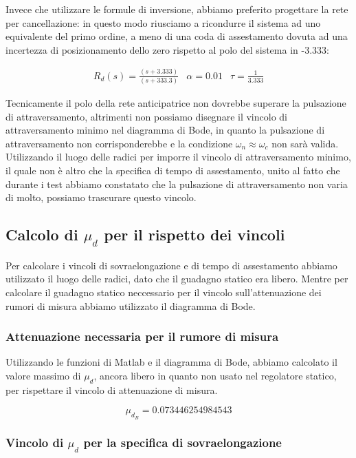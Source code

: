 \documentclass{article}
\begin{document}
Invece che utilizzare le formule di inversione, abbiamo preferito progettare la rete per cancellazione: in questo modo riusciamo a ricondurre il sistema ad uno equivalente del primo ordine, a meno di una coda di assestamento dovuta ad una incertezza di posizionamento dello zero rispetto al polo del sistema in -3.333:

$$
\begin{array}{lll}
    R_d(s) = \frac{(s+3.333)}{(s+333.3)} &\alpha=0.01 & \tau=\frac{1}{3.333}
\end{array}
$$

Tecnicamente il polo della rete anticipatrice non dovrebbe superare la pulsazione di attraversamento, altrimenti non possiamo disegnare il vincolo di attraversamento minimo nel diagramma di Bode, in quanto la pulsazione di attraversamento non corrisponderebbe e la condizione $\omega_n\approx\omega_c$ non sarà valida. Utilizzando il luogo delle radici per imporre il vincolo di attraversamento minimo, il quale non è altro che la specifica di tempo di assestamento, unito al fatto che durante i test abbiamo constatato che la pulsazione di attraversamento non varia di molto, possiamo trascurare questo vincolo.

\subsection{Calcolo di $\mu_d$ per il rispetto dei vincoli}

Per calcolare i vincoli di sovraelongazione e di tempo di assestamento abbiamo utilizzato il luogo delle radici, dato che il guadagno statico era libero. Mentre per calcolare il guadagno statico neccessario per il vincolo sull'attenuazione dei rumori di misura abbiamo utilizzato il diagramma di Bode.

\subsubsection{Attenuazione necessaria per il rumore di misura}

Utilizzando le funzioni di Matlab e il diagramma di Bode, abbiamo calcolato il valore massimo di $\mu_d$, ancora libero in quanto non usato nel regolatore statico, per rispettare il vincolo di attenuazione di misura.

$$
    \mu_{d_B}=0.073446254984543
$$

\newpage

\subsubsection{Vincolo di $\mu_d$ per la specifica di sovraelongazione}
\end{document}
